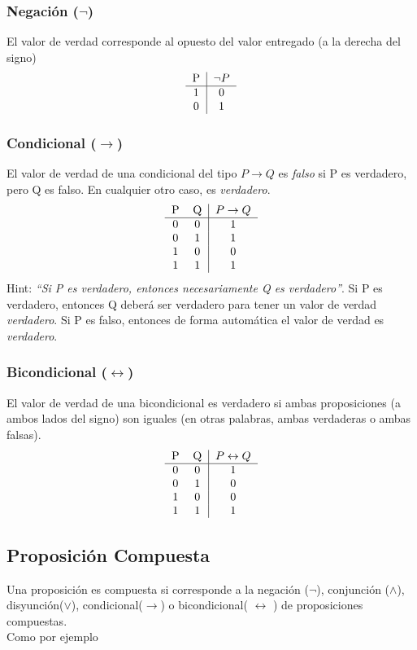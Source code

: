 \documentclass{article}
\begin{document}
\subsubsection{Negación ($\neg$)}
El valor de verdad corresponde al opuesto del valor entregado (a la derecha del signo)
\[
    \begin{tabular}{c|c}
        P & $\neg{}P$\\ \hline
        1 & 0\\
        0 & 1 
    \end{tabular}
\]

\subsubsection{Condicional ($\rightarrow$)}
El valor de verdad de una condicional del tipo $P \rightarrow{}Q$ es \textit{falso} si P es verdadero, pero Q es falso. En cualquier otro caso, es \textit{verdadero}.\\
\[
    \begin{tabular}{cc|c}
        P & Q & $P \rightarrow{}Q$\\ \hline
        0 & 0 & 1\\
        0 & 1 & 1\\
        1 & 0 & 0\\
        1 & 1 & 1
    \end{tabular}
\]
Hint: \textit{``Si P es verdadero, entonces necesariamente Q es verdadero''}. Si P es verdadero, entonces Q deberá ser verdadero para tener un valor de verdad \textit{verdadero}. Si P es falso, entonces de forma automática el valor de verdad es \textit{verdadero}.

\subsubsection{Bicondicional ($\leftrightarrow$)}
El valor de verdad de una bicondicional es verdadero si ambas proposiciones (a ambos lados del signo) son iguales (en otras palabras, ambas verdaderas o ambas falsas).
\[
    \begin{tabular}{cc|c}
        P & Q & $P \leftrightarrow{}Q$\\ \hline
        0 & 0 & 1\\
        0 & 1 & 0\\
        1 & 0 & 0\\
        1 & 1 & 1
    \end{tabular}
\]

\subsection{Proposición Compuesta}
Una proposición es compuesta si corresponde a la negación ($\neg$), conjunción ($\wedge$), disyunción($\vee$), condicional($\rightarrow$) o bicondicional( $\leftrightarrow$ ) de proposiciones compuestas.\\
Como por ejemplo
\end{document}
